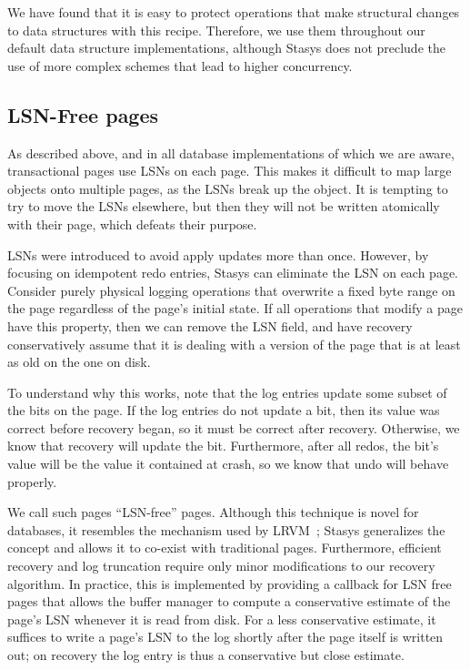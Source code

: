 \documentclass[letterpaper,twocolumn,10pt]{article}
\newcommand{\yad}{Stasys\xspace}
\newcommand{\eat}[1]{}
\begin{document}
We have found that it is easy to protect operations that make
structural changes to data structures with this recipe.
Therefore, we use them throughout our default data structure
implementations, although \yad does not preclude the use of more
complex schemes that lead to higher concurrency.


\subsection{LSN-Free pages}

As described above, and in all database implementations of which we
are aware, transactional pages use LSNs on each page.  This makes it
difficult to map large objects onto multiple pages, as the LSNs break
up the object.  It is tempting to try to move the LSNs elsewhere, but
then they will not be written atomically with their page, which
defeats their purpose.

LSNs were introduced to avoid apply updates more than once. However, by focusing on idempotent redo entries, \yad can eliminate the LSN on each page.
Consider purely physical logging operations that overwrite a fixed
byte range on the page regardless of the page's initial state.  If all
operations that modify a page have this property, then we can remove
the LSN field, and have recovery conservatively assume that it is
dealing with a version of the page that is at least as old on the one
on disk.  

\eat{
This allows non-idempotent operations to be implemented.  For
example, a log entry could simply tell recovery to increment a value
on a page by some value, or to allocate a new record on the page.  
If the recovery algorithm did not know exactly which
version of a page it is dealing with, the operation could
inadvertantly be applied more than once, incrementing the value twice,
or double allocating a record.
}

To understand why this works, note that the log entries
update some subset of the bits on the page.  If the log entries do not
update a bit, then its value was correct before recovery began, so it
must be correct after recovery.  Otherwise, we know that recovery will
update the bit.  Furthermore, after all redos, the bit's value will be the
value it contained at crash, so we know that undo will behave
properly.

We call such pages ``LSN-free'' pages.  Although this technique is
novel for databases, it resembles the mechanism used by
LRVM~\cite{rvm}; \yad generalizes the concept and allows it to
co-exist with traditional pages.  Furthermore, efficient recovery and
log truncation require only minor modifications to our recovery
algorithm.  In practice, this is implemented by providing a callback
for LSN free pages that allows the buffer manager to compute a
conservative estimate of the page's LSN whenever it is read from disk.
For a less conservative estimate, it suffices to write a page's LSN to
the log shortly after the page itself is written out; on recovery the
log entry is thus a conservative but close estimate.
\end{document}
